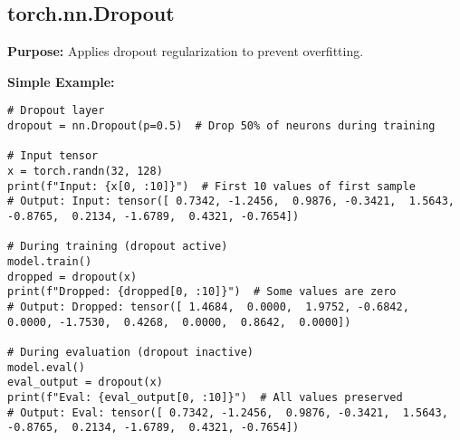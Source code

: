 \documentclass[11pt,a4paper]{book}
\begin{document}
\subsection{torch.nn.Dropout}

\textbf{Purpose:} Applies dropout regularization to prevent overfitting.

\textbf{Simple Example:}
\begin{verbatim}
# Dropout layer
dropout = nn.Dropout(p=0.5)  # Drop 50% of neurons during training

# Input tensor
x = torch.randn(32, 128)
print(f"Input: {x[0, :10]}")  # First 10 values of first sample
# Output: Input: tensor([ 0.7342, -1.2456,  0.9876, -0.3421,  1.5643, -0.8765,  0.2134, -1.6789,  0.4321, -0.7654])

# During training (dropout active)
model.train()
dropped = dropout(x)
print(f"Dropped: {dropped[0, :10]}")  # Some values are zero
# Output: Dropped: tensor([ 1.4684,  0.0000,  1.9752, -0.6842,  0.0000, -1.7530,  0.4268,  0.0000,  0.8642,  0.0000])

# During evaluation (dropout inactive)
model.eval()
eval_output = dropout(x)
print(f"Eval: {eval_output[0, :10]}")  # All values preserved
# Output: Eval: tensor([ 0.7342, -1.2456,  0.9876, -0.3421,  1.5643, -0.8765,  0.2134, -1.6789,  0.4321, -0.7654])
\end{verbatim}
\end{document}
